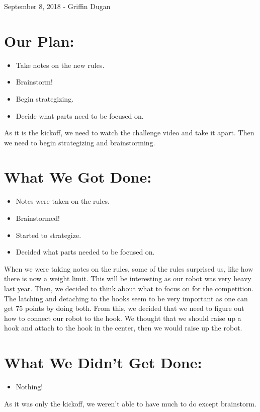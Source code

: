 \documentclass[12pt]{article}
\begin{document}
September 8, 2018 - Griffin Dugan

\section{Our Plan:} 
\begin{itemize}
	\item Take notes on the new rules. 
	\item Brainstorm! 
	\item Begin strategizing.
	\item Decide what parts need to be focused on. 
\end{itemize}

As it is the kickoff, we need to watch the challenge video and take it apart. Then we need to begin strategizing and brainstorming. 

\section{What We Got Done:}
\begin{itemize}
	\item Notes were taken on the rules.
	\item Brainstormed! 
	\item Started to strategize. 
	\item Decided what parts needed to be focused on. 
\end{itemize}

When we were taking notes on the rules, some of the rules surprised us, like how there is now a weight limit. This will be interesting as our robot was very heavy last year. Then, we decided to think about what to focus on for the competition. The latching and detaching to the hooks seem to be very important as one can get 75 points by doing both. From this, we decided that we need to figure out how to connect our robot to the hook. We thought that we should raise up a hook and attach to the hook in the center, then we would raise up the robot. 

\section{What We Didn't Get Done:} 
\begin{itemize}
	\item Nothing! 
\end{itemize}

As it was only the kickoff, we weren't able to have much to do except brainstorm. 
\end{document}
